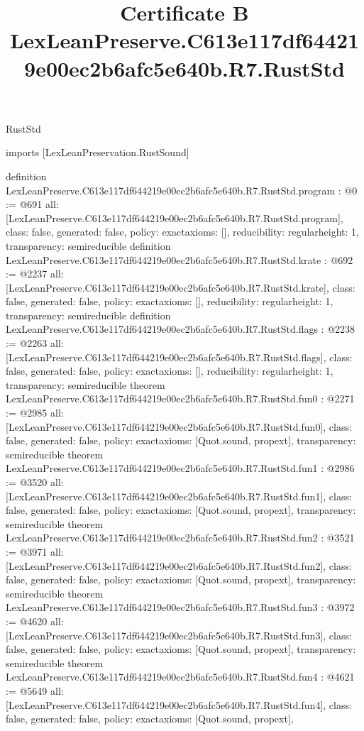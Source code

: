 \begin{lexlean}{RustStd}
\title{Certificate B LexLeanPreserve.C613e117df644219e00ec2b6afc5e640b.R7.RustStd}
\begin{coremodule}
imports [LexLeanPreservation.RustSound]

definition LexLeanPreserve.C613e117df644219e00ec2b6afc5e640b.R7.RustStd.program : @0 := @691 {
  all: [LexLeanPreserve.C613e117df644219e00ec2b6afc5e640b.R7.RustStd.program],
  class: false,
  generated: false,
  policy: exact{axioms: []},
  reducibility: regular{height: 1},
  transparency: semireducible
}
definition LexLeanPreserve.C613e117df644219e00ec2b6afc5e640b.R7.RustStd.krate : @692 := @2237 {
  all: [LexLeanPreserve.C613e117df644219e00ec2b6afc5e640b.R7.RustStd.krate],
  class: false,
  generated: false,
  policy: exact{axioms: []},
  reducibility: regular{height: 1},
  transparency: semireducible
}
definition LexLeanPreserve.C613e117df644219e00ec2b6afc5e640b.R7.RustStd.flags : @2238 := @2263 {
  all: [LexLeanPreserve.C613e117df644219e00ec2b6afc5e640b.R7.RustStd.flags],
  class: false,
  generated: false,
  policy: exact{axioms: []},
  reducibility: regular{height: 1},
  transparency: semireducible
}
theorem LexLeanPreserve.C613e117df644219e00ec2b6afc5e640b.R7.RustStd.fun0 : @2271 := @2985 {
  all: [LexLeanPreserve.C613e117df644219e00ec2b6afc5e640b.R7.RustStd.fun0],
  class: false,
  generated: false,
  policy: exact{axioms: [Quot.sound, propext]},
  transparency: semireducible
}
theorem LexLeanPreserve.C613e117df644219e00ec2b6afc5e640b.R7.RustStd.fun1 : @2986 := @3520 {
  all: [LexLeanPreserve.C613e117df644219e00ec2b6afc5e640b.R7.RustStd.fun1],
  class: false,
  generated: false,
  policy: exact{axioms: [Quot.sound, propext]},
  transparency: semireducible
}
theorem LexLeanPreserve.C613e117df644219e00ec2b6afc5e640b.R7.RustStd.fun2 : @3521 := @3971 {
  all: [LexLeanPreserve.C613e117df644219e00ec2b6afc5e640b.R7.RustStd.fun2],
  class: false,
  generated: false,
  policy: exact{axioms: [Quot.sound, propext]},
  transparency: semireducible
}
theorem LexLeanPreserve.C613e117df644219e00ec2b6afc5e640b.R7.RustStd.fun3 : @3972 := @4620 {
  all: [LexLeanPreserve.C613e117df644219e00ec2b6afc5e640b.R7.RustStd.fun3],
  class: false,
  generated: false,
  policy: exact{axioms: [Quot.sound, propext]},
  transparency: semireducible
}
theorem LexLeanPreserve.C613e117df644219e00ec2b6afc5e640b.R7.RustStd.fun4 : @4621 := @5649 {
  all: [LexLeanPreserve.C613e117df644219e00ec2b6afc5e640b.R7.RustStd.fun4],
  class: false,
  generated: false,
  policy: exact{axioms: [Quot.sound, propext]},
}
\end{coremodule}
\end{lexlean}
